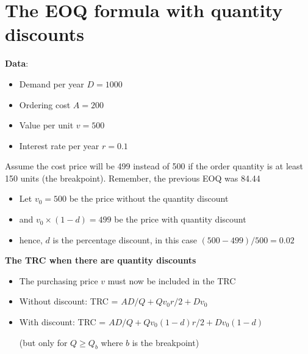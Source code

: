 \documentclass[10pt]{article}
\begin{document}
\section{The EOQ formula with quantity discounts}
\textbf{Data}:
\begin{itemize}
    \item Demand per year $D = 1000 $
    \item Ordering cost $A = 200 $
    \item Value per unit $v = 500 $
    \item Interest rate per year $r = 0.1 $
\end{itemize}
Assume the cost price will be 499 instead of 500 if the order quantity is at least 150 units (the breakpoint). Remember, the previous EOQ was 84.44

\begin{itemize}
    \item Let $v_0 = 500 $ be the price without the quantity discount
    \item and $v_0\times (1 - d) = 499 $ be the price with quantity discount
    \item hence, $d $ is the percentage discount, in this case $(500 - 499) / 500 = 0.02 $
\end{itemize}
\textbf{The TRC when there are quantity discounts}
\begin{itemize}
    \item The purchasing price $v $ must now be included in the TRC 
    \item Without discount: TRC = $AD / Q + Qv_0r / 2+ Dv_0 $
    \item With discount: TRC = $AD / Q + Qv_0(1 - d)r / 2+ Dv_0 (1 - d)$

    (but only for $Q \ge Q_b $ where $b $ is the breakpoint)
\end{itemize}
\end{document}
